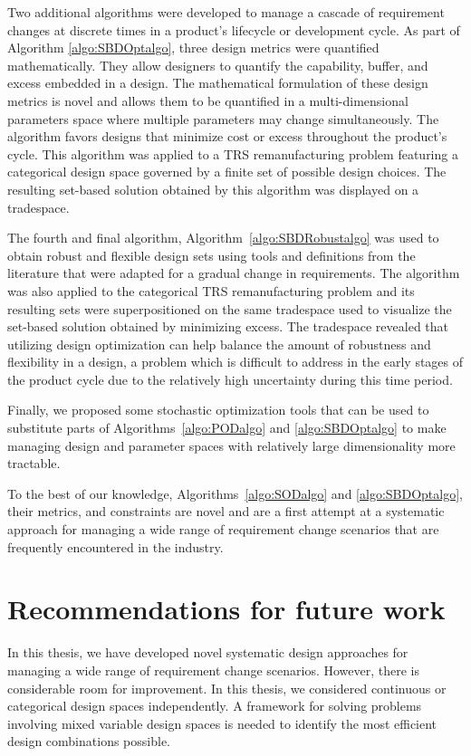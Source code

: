 Two additional algorithms were developed to manage a cascade of requirement chang\-es at discrete times in a product's lifecycle or development cycle. As part of Algorithm \ref{algo:SBDOptalgo}, three design metrics were quantified mathematically. They allow designers to quantify the capability, buffer, and excess embedded in a design. The mathematical formulation of these design metrics is novel and allows them to be quantified in a multi-dimensional parameters space where multiple parameters may change simultaneously. The algorithm favors designs that minimize cost or excess throughout the product's cycle. This algorithm was applied to a \ac{TRS} remanufacturing problem featuring a categorical design space governed by a finite set of possible design choices. The resulting set-based solution obtained by this algorithm was displayed on a tradespace.

The fourth and final algorithm, Algorithm~\ref{algo:SBDRobustalgo} was used to obtain robust and flexible design sets using tools and definitions from the literature that were adapted for a gradual change in requirements. The algorithm was also applied to the categorical \ac{TRS} remanufacturing problem and its resulting sets were superpositioned on the same tradespace used to visualize the set-based solution obtained by minimizing excess. The tradespace revealed that utilizing design optimization can help balance the amount of robustness and flexibility in a design, a problem which is difficult to address in the early stages of the product cycle due to the relatively high uncertainty during this time period.

Finally, we proposed some stochastic optimization tools that can be used to substitute parts of Algorithms~\ref{algo:PODalgo} and \ref{algo:SBDOptalgo} to make managing design and parameter spaces with relatively large dimensionality more tractable.

To the best of our knowledge, Algorithms~\ref{algo:SODalgo} and \ref{algo:SBDOptalgo}, their metrics, and constraints are novel and are a first attempt at a systematic approach for managing a wide range of requirement change scenarios that are frequently encountered in the industry.

\section{Recommendations for future work}
\label{sec:futurework}

In this thesis, we have developed novel systematic design approaches for managing a wide range of requirement change scenarios. However, there is considerable room for improvement. In this thesis, we considered continuous or categorical design spaces independently. A framework for solving problems involving mixed variable design spaces is needed to identify the most efficient design combinations possible. 

